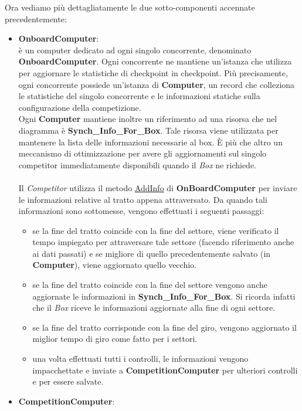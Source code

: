 Ora vediamo pi\`{u} dettagliatamente le due sotto-componenti accennate precedentemente:
\begin{itemize}
\item \textbf{OnboardComputer}:\\
\`{e} un computer dedicato ad ogni singolo concorrente, denominato \textbf{OnboardComputer}. Ogni concorrente ne mantiene un'istanza che utilizza
per aggiornare le statistiche di checkpoint in checkpoint. Pi\`{u} precisamente, ogni concorrente possiede un'istanza di \textbf{Computer}, un record
che colleziona le statistiche del singolo concorrente e le informazioni statiche sulla configurazione della competizione.\\
Ogni \textbf{Computer} mantiene inoltre un riferimento ad una risorsa che nel diagramma \`{e} \textbf{Synch\_Info\_For\_Box}. Tale risorsa
viene utilizzata per mantenere la lista delle informazioni necessarie al box. \`{E} pi\`{u} che altro un meccanismo di ottimizzazione per avere
gli aggiornamenti sul singolo competitor immediatamente disponibili quando il \emph{Box} ne richiede.\\\\
Il \emph{Competitor} utilizza il metodo \underline{AddInfo} di \textbf{OnBoardComputer} 
per inviare le informazioni relative al tratto appena attraversato. Da quando tali informazioni sono sottomesse, vengono effettuati i seguenti
passaggi:
\begin{itemize}
\item se la fine del tratto coincide con la fine del settore, viene verificato il tempo impiegato per attraversare tale settore (facendo riferimento
anche ai dati passati) e se migliore di quello precedentemente salvato (in \textbf{Computer}), viene aggiornato quello vecchio.
\item se la fine del tratto coincide con la fine del settore vengono anche aggiornate le informazioni in \textbf{Synch\_Info\_For\_Box}. 
Si ricorda infatti che il \emph{Box} riceve le informazioni aggiornate alla fine di ogni settore.
\item se la fine del tratto corrisponde con la fine del giro, vengono aggiornato il miglior tempo di giro come fatto per i settori.
\item una volta effettuati tutti i controlli, le informazioni vengono impacchettate e inviate a \textbf{CompetitionComputer} per ulteriori
controlli e per essere salvate.
\end{itemize}
\item \textbf{CompetitionComputer}:\\

\end{itemize}
